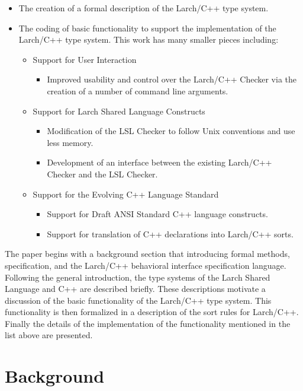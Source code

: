 \documentclass[12pt]{article} %
\begin{document}
\begin{itemize}
\item The creation of a formal description of the Larch/C++ type system.

\item The coding of basic functionality to support the 
implementation of the Larch/C++ type system. This work has many
smaller pieces including:

\begin{itemize}
\item Support for User Interaction 
\begin{itemize}
\item Improved usability and control over the Larch/C++ Checker via the
creation of a number of command line arguments.
\end{itemize}

\item Support for Larch Shared Language Constructs
\begin{itemize}
\item Modification of the LSL Checker to follow Unix conventions and
use less memory.
\item Development of an interface between the existing Larch/C++ Checker and
the LSL Checker.
\end{itemize}

\item Support for the Evolving C++ Language Standard
\begin{itemize}
\item Support for Draft ANSI Standard C++ \cite{C++Apr95}
language constructs.
\item Support for translation of C++ declarations into Larch/C++
sorts.
\end{itemize}
\end{itemize}
\end{itemize}

The paper begins with a background section that introducing formal
methods, specification, and the Larch/C++ behavioral interface
specification language. Following the general introduction, the type
systems of the Larch Shared Language and C++ are described
briefly. These descriptions motivate a discussion of the basic
functionality of the Larch/C++ type system. This functionality is then
formalized in a description of the sort rules for Larch/C++. Finally
the details of the implementation of the functionality mentioned in
the list above are presented.

\section{Background}
\label{background}
\end{document}
